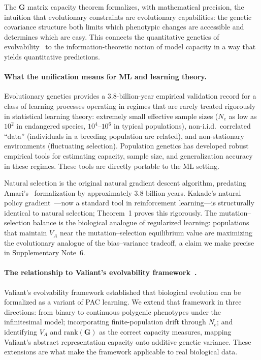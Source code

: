 \documentclass[12pt]{article}
\theoremstyle{remark}
\begin{document}
The $\mathbf{G}$ matrix capacity theorem formalizes, with mathematical precision, the intuition that evolutionary constraints are evolutionary capabilities: the genetic covariance structure both limits which phenotypic changes are accessible and determines which are easy. This connects the quantitative genetics of evolvability~\cite{houle1992,pigliucci2008} to the information-theoretic notion of model capacity in a way that yields quantitative predictions.

\paragraph{What the unification means for ML and learning theory.} Evolutionary genetics provides a 3.8-billion-year empirical validation record for a class of learning processes operating in regimes that are rarely treated rigorously in statistical learning theory: extremely small effective sample sizes ($N_e$ as low as $10^2$ in endangered species, $10^4$--$10^6$ in typical populations), non-i.i.d.\ correlated ``data'' (individuals in a breeding population are related), and non-stationary environments (fluctuating selection). Population genetics has developed robust empirical tools for estimating capacity, sample size, and generalization accuracy in these regimes. These tools are directly portable to the ML setting.

Natural selection is the original natural gradient descent algorithm, predating Amari's~\cite{amari1998} formalization by approximately 3.8 billion years. Kakade's natural policy gradient~\cite{kakade2001}---now a standard tool in reinforcement learning---is structurally identical to natural selection; Theorem~1 proves this rigorously. The mutation--selection balance is the biological analogue of regularized learning: populations that maintain $V_A$ near the mutation--selection equilibrium value are maximizing the evolutionary analogue of the bias--variance tradeoff, a claim we make precise in Supplementary Note~6.

\paragraph{The relationship to Valiant's evolvability framework~\cite{valiant2009}.} Valiant's evolvability framework established that biological evolution can be formalized as a variant of PAC learning. We extend that framework in three directions: from binary to continuous polygenic phenotypes under the infinitesimal model; incorporating finite-population drift through $N_e$; and identifying $V_A$ and $\mathrm{rank}(\mathbf{G})$ as the correct capacity measures, mapping Valiant's abstract representation capacity onto additive genetic variance. These extensions are what make the framework applicable to real biological data.
\end{document}
